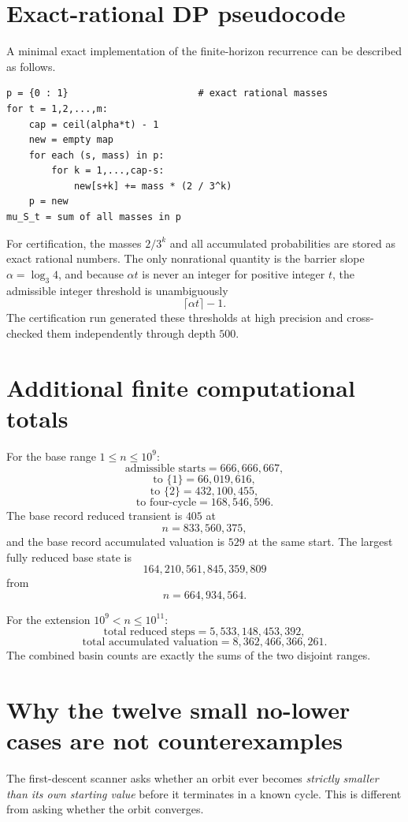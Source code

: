 \documentclass[11pt]{article}
\theoremstyle{definition}
\theoremstyle{remark}
\begin{document}
\appendix

\section{Exact-rational DP pseudocode}

A minimal exact implementation of the finite-horizon recurrence can be described as follows.

\begin{verbatim}
p = {0 : 1}                       # exact rational masses
for t = 1,2,...,m:
    cap = ceil(alpha*t) - 1
    new = empty map
    for each (s, mass) in p:
        for k = 1,...,cap-s:
            new[s+k] += mass * (2 / 3^k)
    p = new
mu_S_t = sum of all masses in p
\end{verbatim}

For certification, the masses $2/3^k$ and all accumulated probabilities are stored as exact rational numbers.  The only nonrational quantity is the barrier slope $\alpha=\log_3 4$, and because $\alpha t$ is never an integer for positive integer $t$, the admissible integer threshold is unambiguously
\[
\lceil\alpha t\rceil-1.
\]
The certification run generated these thresholds at high precision and cross-checked them independently through depth $500$.

\section{Additional finite computational totals}

For the base range $1\le n\le10^9$:
\[
\text{admissible starts}=666,666,667,
\]
\[
\text{to }\{1\}=66,019,616,
\]
\[
\text{to }\{2\}=432,100,455,
\]
\[
\text{to four-cycle}=168,546,596.
\]
The base record reduced transient is $405$ at
\[
n=833,560,375,
\]
and the base record accumulated valuation is $529$ at the same start.  The largest fully reduced base state is
\[
164,210,561,845,359,809
\]
from
\[
n=664,934,564.
\]

For the extension $10^9<n\le10^{11}$:
\[
\text{total reduced steps}=5,533,148,453,392,
\]
\[
\text{total accumulated valuation}=8,362,466,366,261.
\]
The combined basin counts are exactly the sums of the two disjoint ranges.

\section{Why the twelve small no-lower cases are not counterexamples}

The first-descent scanner asks whether an orbit ever becomes \emph{strictly smaller than its own starting value} before it terminates in a known cycle.  This is different from asking whether the orbit converges.
\end{document}
